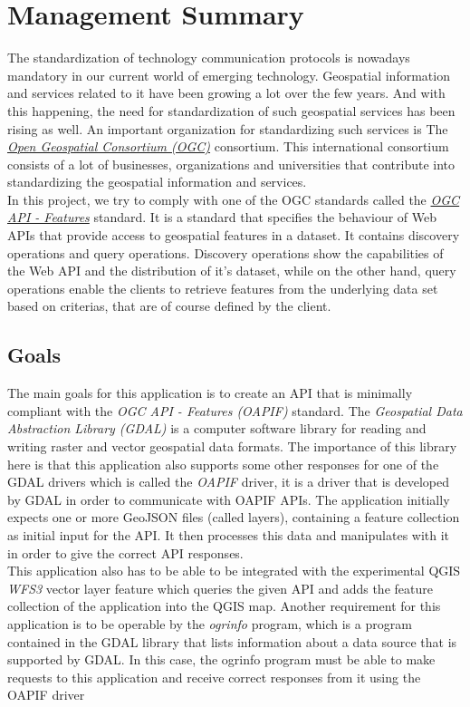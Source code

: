 \chapter*{Management Summary}
The standardization of technology communication protocols is nowadays mandatory in our current world of emerging technology. Geospatial information and services related to it have been growing a lot over the few years. And with this happening, the need for standardization of such geospatial services has been rising as well. An important organization for standardizing such services is The \href{https://www.ogc.org/}{\textit{Open Geospatial Consortium (OGC)}} consortium. This international consortium consists of a lot of businesses, organizations and universities that contribute into standardizing the geospatial information and services.\\
In this project, we try to comply with one of the OGC standards called the \href{https://docs.opengeospatial.org/is/17-069r3/17-069r3.html}{\textit{OGC API - Features}} standard. It is a standard that specifies the behaviour of Web APIs that provide access to geospatial features in a dataset. It contains discovery operations and query operations. Discovery operations show the capabilities of the Web API and the distribution of it's dataset, while on the other hand, query operations enable the clients to retrieve features from the underlying data set based on criterias, that are of course defined by the client.
\section*{Goals}
The main goals for this application is to create an API that is minimally compliant with the \textit{OGC API - Features (OAPIF)} standard. The \textit{Geospatial Data Abstraction Library (GDAL)} is a computer software library for reading and writing raster and vector geospatial data formats. The importance of this library here is that this application also supports some other responses for one of the GDAL drivers which is called the \textit{OAPIF} driver, it is a driver that is developed by GDAL in order to communicate with OAPIF APIs.
The application initially expects one or more GeoJSON files (called layers),
containing a feature collection as initial input for the API. It then processes this data and manipulates with it in order to give the correct API responses.\\
This application also has to be able to be integrated with the experimental QGIS \textit{WFS3} vector layer feature which queries the given API and adds the feature collection of the application into the QGIS map. Another requirement for this application is to be operable by the \textit{ogrinfo} program, which is a program contained in the GDAL library that lists information about a data source that is supported by GDAL. In this case, the ogrinfo program must be able to make requests to this application and receive correct responses from it using the OAPIF driver
